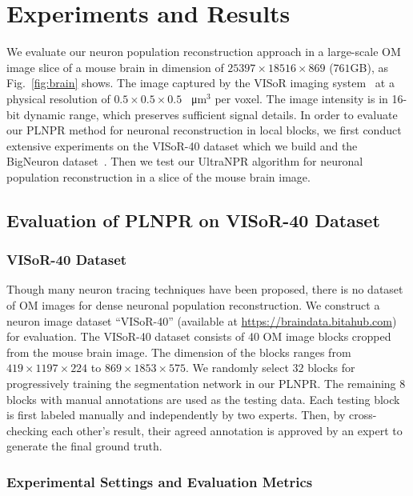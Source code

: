 \section{Experiments and Results}
\label{sec:experiments}

We evaluate our neuron population reconstruction approach in a large-scale OM image slice of a mouse brain in dimension of $25397\times 18516\times 869$ ($761$GB), as Fig.~\ref{fig:brain} shows.
%
The image  captured by the VISoR imaging system~\cite{Wang2019} at a physical resolution of $0.5 \times0.5 \times 0.5$ \SI{}{\micro\metre}$^3$ per voxel. 
%
The image intensity is in 16-bit dynamic range, which preserves sufficient signal details.
In order to evaluate our PLNPR method for neuronal reconstruction in local blocks, we first conduct extensive experiments on the VISoR-40 dataset which we build and the BigNeuron dataset~\cite{peng2015}. 
%
Then we test our UltraNPR algorithm for neuronal population reconstruction in a slice of the mouse brain image.

\subsection{Evaluation of PLNPR on VISoR-40 Dataset}
\label{sec:exp_PLNPR_VISoR}

\subsubsection{VISoR-40 Dataset}
Though many neuron tracing techniques have been proposed, there is no dataset of OM images for dense neuronal population reconstruction.
We construct a neuron image dataset ``VISoR-40'' (available at \url{https://braindata.bitahub.com}) for evaluation. 
The VISoR-40 dataset consists of 40 OM image blocks cropped from the mouse brain image. The dimension of the blocks ranges from $419 \times1197 \times 224$ to $869 \times1853 \times 575$.
%
We randomly select $ 32 $ blocks for progressively training the segmentation network in our PLNPR.
%
The remaining 8 blocks with manual annotations are used as the testing data.
Each testing block is first labeled manually and independently by two experts. Then, by cross-checking each other's result, their agreed annotation is approved by an expert to generate the final ground truth.

\subsubsection{Experimental Settings and Evaluation Metrics}


